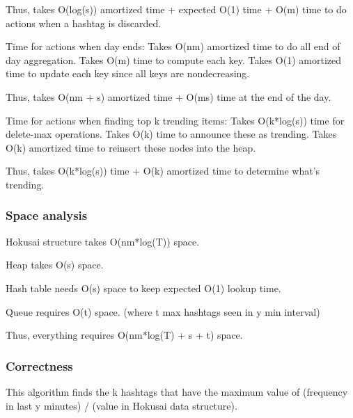 \documentclass[a4paper,12pt]{article}
\begin{document}
Thus, takes O(log(s)) amortized time + expected O(1) time  + O(m) time to do actions when a hashtag is discarded.
			

Time for actions when day ends:
Takes O(nm) amortized time to do all end of day aggregation.
Takes O(m) time to compute each key.
Takes O(1) amortized time to update each key since all keys are nondecreasing.

Thus, takes O(nm + s) amortized time + O(ms) time at the end of the day.

Time for actions when finding top k trending items:
	Takes O(k*log(s)) time for delete-max operations.
	Takes O(k) time to announce these as trending.
Takes O(k) amortized time to reinsert these nodes into the heap.

Thus, takes O(k*log(s)) time + O(k) amortized time to determine what’s trending.



\subsubsection{Space analysis}

Hokusai structure takes O(nm*log(T)) space.

Heap takes O(s) space.

Hash table needs O(s) space to keep expected O(1) lookup time.

Queue requires O(t) space. (where t max hashtags seen in y min interval)

Thus, everything requires O(nm*log(T) + s + t) space.

\subsubsection{Correctness \label{Correct}}

This algorithm finds the k hashtags that have the maximum value of (frequency in last y minutes) / (value in Hokusai data structure).
\end{document}

